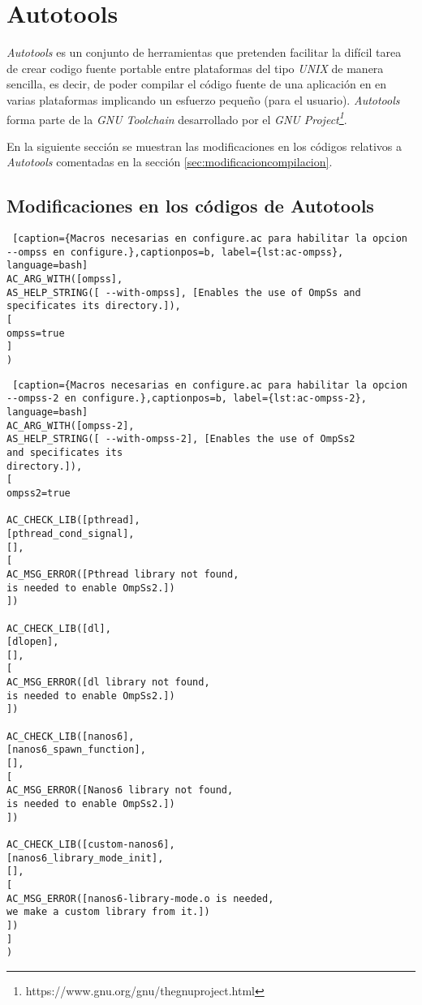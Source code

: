 
\section{Autotools}
\label{appendix:autotools}
 
\textit{Autotools} es un conjunto de herramientas que pretenden facilitar la difícil tarea de crear codigo fuente portable entre plataformas del tipo \textit{UNIX} de manera sencilla, es decir, de poder compilar el código fuente de una aplicación en en varias plataformas implicando un esfuerzo pequeño (para el usuario). \textit{Autotools} forma parte de la \textit{GNU Toolchain} desarrollado por el \textit{GNU Project\footnote{https://www.gnu.org/gnu/thegnuproject.html}}.

En la siguiente sección se muestran las modificaciones en los códigos relativos a \textit{Autotools} comentadas en la sección \ref{sec:modificacioncompilacion}.

\subsection{Modificaciones en los códigos de Autotools}

\smallskip

\begin{lstlisting} [caption={Macros necesarias en configure.ac para habilitar la opcion --ompss en configure.},captionpos=b, label={lst:ac-ompss}, language=bash]
AC_ARG_WITH([ompss],
AS_HELP_STRING([ --with-ompss], [Enables the use of OmpSs and 
specificates its directory.]),
[
ompss=true
]
)
\end{lstlisting}

\smallskip

\begin{lstlisting} [caption={Macros necesarias en configure.ac para habilitar la opcion --ompss-2 en configure.},captionpos=b, label={lst:ac-ompss-2}, language=bash]
AC_ARG_WITH([ompss-2],
AS_HELP_STRING([ --with-ompss-2], [Enables the use of OmpSs2 
and specificates its 
directory.]),
[
ompss2=true

AC_CHECK_LIB([pthread], 
[pthread_cond_signal], 
[],
[
AC_MSG_ERROR([Pthread library not found, 
is needed to enable OmpSs2.])
])

AC_CHECK_LIB([dl], 
[dlopen], 
[],
[
AC_MSG_ERROR([dl library not found, 
is needed to enable OmpSs2.])
])

AC_CHECK_LIB([nanos6], 
[nanos6_spawn_function], 
[],
[
AC_MSG_ERROR([Nanos6 library not found, 
is needed to enable OmpSs2.])
])

AC_CHECK_LIB([custom-nanos6], 
[nanos6_library_mode_init], 
[],
[
AC_MSG_ERROR([nanos6-library-mode.o is needed, 
we make a custom library from it.])
])
]
)
\end{lstlisting}

